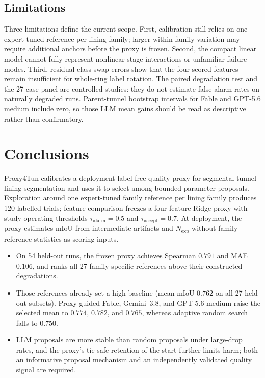\documentclass[a4paper,fleqn]{cas-dc}
\begin{document}
{\subsection{Limitations}\label{sec:limitations}

Three limitations define the current scope. First, calibration still relies on one expert-tuned reference per lining family; larger within-family variation may require additional anchors before the proxy is frozen. Second, the compact linear model cannot fully represent nonlinear stage interactions or unfamiliar failure modes. Third, residual class-swap errors show that the four scored features remain insufficient for whole-ring label rotation. The paired degradation test and the 27-case panel are controlled studies: they do not estimate false-alarm rates on naturally degraded runs. Parent-tunnel bootstrap intervals for Fable and GPT-5.6 medium include zero, so those LLM mean gains should be read as descriptive rather than confirmatory.


\section{Conclusions}\label{sec:conclusions}

Proxy4Tun calibrates a deployment-label-free quality proxy for segmental tunnel-lining segmentation and uses it to select among bounded parameter proposals. Exploration around one expert-tuned family reference per lining family produces 120 labelled trials; feature comparison freezes a four-feature Ridge proxy with study operating thresholds $\tau_{\mathrm{alarm}}=0.5$ and $\tau_{\mathrm{accept}}=0.7$. At deployment, the proxy estimates mIoU from intermediate artifacts and $N_{\mathrm{exp}}$ without family-reference statistics as scoring inputs.

\begin{itemize}
\item On 54 held-out runs, the frozen proxy achieves Spearman $0.791$ and MAE~$0.106$, and ranks all 27 family-specific references above their constructed degradations.
\item Those references already set a high baseline (mean mIoU $0.762$ on all 27 held-out subsets). Proxy-guided Fable, Gemini~3.8, and GPT-5.6 medium raise the selected mean to $0.774$, $0.782$, and $0.765$, whereas adaptive random search falls to $0.750$.
\item LLM proposals are more stable than random proposals under large-drop rates, and the proxy's tie-safe retention of the start further limits harm; both an informative proposal mechanism and an independently validated quality signal are required.
\end{itemize}

}
\end{document}
